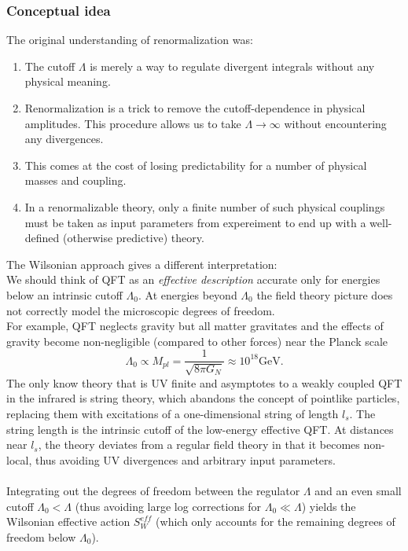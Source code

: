 \subsubsection{Conceptual idea}
The original understanding of renormalization was:
\begin{enumerate}
	\item The cutoff $\Lambda$ is merely a way to regulate divergent integrals without any physical meaning.
	\item Renormalization is a trick to remove the cutoff-dependence in physical amplitudes. This procedure allows us to take $\Lambda \rightarrow \infty$ without encountering any divergences.
	\item This comes at the cost of losing predictability for a number of physical masses and coupling.
	\item In a renormalizable theory, only a finite number of such physical couplings must be taken as input parameters from expereiment to end up with a well-defined (otherwise predictive) theory.
\end{enumerate}
The Wilsonian approach gives a different interpretation:\\
We should think of QFT as an \emph{effective description} accurate only for energies below an intrinsic cutoff $\Lambda_0$. At energies beyond $\Lambda_0$ the field theory picture does not correctly model the microscopic degrees of freedom.\\
For example, QFT neglects gravity but all matter gravitates and the effects of gravity become non-negligible (compared to other forces) near the Planck scale
\begin{equation}
	\Lambda_0 \propto M_{pl} = \frac{1}{\sqrt{8  \pi G_N}} \approx 10^{18} \mathrm{GeV}.
\end{equation}
The only know theory that is UV finite and asymptotes to a weakly coupled QFT in the infrared is string theory, which abandons the concept of pointlike particles, replacing them with excitations of a one-dimensional string of length $l_s$. The string length is the intrinsic cutoff of the low-energy effective QFT. At distances near $l_s$, the theory deviates from a regular field theory in that it becomes non-local, thus avoiding UV divergences and arbitrary input parameters.\\
\\
Integrating out the degrees of freedom between the regulator $\Lambda$ and an even small cutoff $\Lambda_0 < \Lambda$ (thus avoiding large log corrections for $\Lambda_0 \ll \Lambda$) yields the Wilsonian effective action $S^{eff}_W$ (which only accounts for the remaining degrees of freedom below $\Lambda_0$).\\
